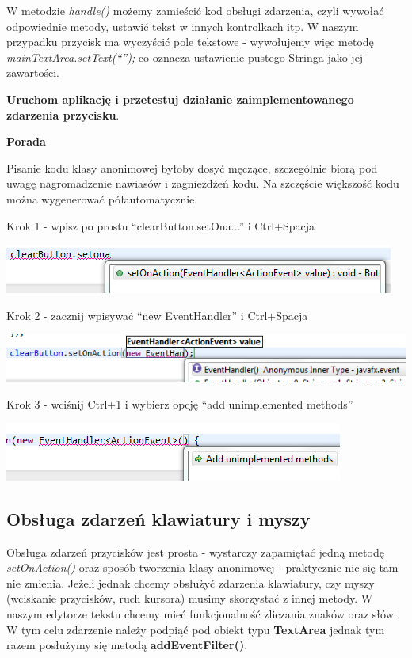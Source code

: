 \documentclass[letterpaper,10pt,english]{sphinxmanual}
\begin{document}
W metodzie \emph{handle()} możemy zamieścić kod obsługi zdarzenia, czyli wywołać odpowiednie metody, ustawić tekst w innych kontrolkach itp. W naszym przypadku przycisk ma wyczyścić pole tekstowe - wywołujemy więc metodę \emph{mainTextArea.setText(``'');} co oznacza ustawienie pustego Stringa jako jej zawartości.

\textbf{Uruchom aplikację i przetestuj działanie zaimplementowanego zdarzenia przycisku}.

\textbf{Porada}

Pisanie kodu klasy anonimowej byłoby dosyć męczące, szczególnie biorą pod uwagę nagromadzenie nawiasów i zagnieżdżeń kodu. Na szczęście większość kodu można wygenerować półautomatycznie.

Krok 1 - wpisz po prostu ``clearButton.setOna...'' i Ctrl+Spacja

{\hfill\includegraphics{step1.png}\hfill}

Krok 2 - zacznij wpisywać ``new EventHandler'' i Ctrl+Spacja

{\hfill\includegraphics{step2.png}\hfill}

Krok 3 - wciśnij Ctrl+1 i wybierz opcję ``add unimplemented methods''

{\hfill\includegraphics{step3.png}\hfill}


\subsection{Obsługa zdarzeń klawiatury i myszy}
\label{gui2:obsluga-zdarzen-klawiatury-i-myszy}
Obsługa zdarzeń przycisków jest prosta - wystarczy zapamiętać jedną metodę \emph{setOnAction()} oraz sposób tworzenia klasy anonimowej - praktycznie nic się tam nie zmienia. Jeżeli jednak chcemy obsłużyć zdarzenia klawiatury, czy myszy (wciskanie przycisków, ruch kursora) musimy skorzystać z innej metody. W naszym edytorze tekstu chcemy mieć funkcjonalność zliczania znaków oraz słów. W tym celu zdarzenie należy podpiąć pod obiekt typu \textbf{TextArea} jednak tym razem posłużymy się metodą \textbf{addEventFilter()}.
\end{document}
